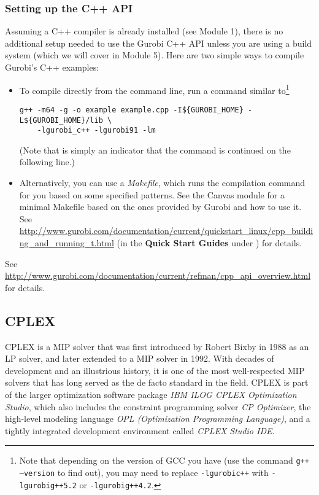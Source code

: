 \documentclass[12pt]{article}
\begin{document}
\subsubsection{Setting up the C++ API}
Assuming a C++ compiler is already installed (see Module 1), there is no additional setup needed to use the Gurobi C++ API unless you are using a build system (which we will cover in Module 5).
Here are two simple ways to compile Gurobi's C++ examples:
\begin{itemize}
    \item To compile directly from the command line, run a command similar to\footnote{
        Note that depending on the version of GCC you have (use the command \texttt{g++ --version} to find out), you may need to replace \texttt{-lgurobi\ttul c++} with \texttt{-lgurobi\ttul g++5.2} or \texttt{-lgurobi\ttul g++4.2}.
        }
\begin{verbatim}
g++ -m64 -g -o example example.cpp -I${GUROBI_HOME} -L${GUROBI_HOME}/lib \
    -lgurobi_c++ -lgurobi91 -lm
\end{verbatim}
        (Note that \texttt{} is simply an indicator that the command is continued on the following line.)
    \item Alternatively, you can use a \emph{Makefile}, which runs the compilation command for you based on some specified patterns.
        See the Canvas module for a minimal Makefile based on the ones provided by Gurobi and how to use it.
        See \url{http://www.gurobi.com/documentation/current/quickstart_linux/cpp_building_and_running_t.html} (in the \textbf{Quick Start Guides} under ) for details.
\end{itemize}
See \url{http://www.gurobi.com/documentation/current/refman/cpp_api_overview.html} for details.



\subsection{CPLEX}
CPLEX is a MIP solver that was first introduced by Robert Bixby in 1988 as an LP solver, and later extended to a MIP solver in 1992.
With decades of development and an illustrious history, it is one of the most well-respected MIP solvers that has long served as the de facto standard in the field.
CPLEX is part of the larger optimization software package \textit{IBM ILOG CPLEX Optimization Studio}, which also includes the constraint programming solver \textit{CP Optimizer}, the high-level modeling language \textit{OPL (Optimization Programming Language)}, and a tightly integrated development environment called \textit{CPLEX Studio IDE}.
\end{document}
